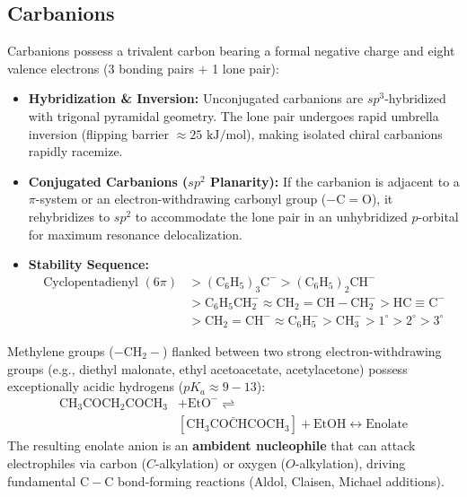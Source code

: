 \documentclass[10pt,twoside,openright]{book}
\begin{document}
\subsection{Carbanions}

\begin{conceptbox}
Carbanions possess a trivalent carbon bearing a formal negative charge and eight valence electrons (3 bonding pairs $+$ 1 lone pair):
\begin{itemize}
  \item \textbf{Hybridization \& Inversion:} Unconjugated carbanions are $sp^3$-hybridized with trigonal pyramidal geometry. The lone pair undergoes rapid umbrella inversion (flipping barrier $\approx 25\text{ kJ/mol}$), making isolated chiral carbanions rapidly racemize.
  \item \textbf{Conjugated Carbanions ($sp^2$ Planarity):} If the carbanion is adjacent to a $\pi$-system or an electron-withdrawing carbonyl group ($-\mathrm{C=O}$), it rehybridizes to $sp^2$ to accommodate the lone pair in an unhybridized $p$-orbital for maximum resonance delocalization.
  \item \textbf{Stability Sequence:}
  \begin{equation}
    \begin{aligned}
      \text{Cyclopentadienyl } (6\pi) &> \mathrm{(C_6H_5)_3C^-} > \mathrm{(C_6H_5)_2CH^-} \\
      &> \mathrm{C_6H_5CH_2^-} \approx \mathrm{CH_2=CH-CH_2^-} > \mathrm{HC\equiv C^-} \\
      &> \mathrm{CH_2=CH^-} \approx \mathrm{C_6H_5^-} > \mathrm{CH_3^-} > 1^\circ > 2^\circ > 3^\circ
    \end{aligned}
  \end{equation}
\end{itemize}
\end{conceptbox}

\begin{usecasebox}
Methylene groups ($-\mathrm{CH_2}-$) flanked between two strong electron-withdrawing groups (e.g., diethyl malonate, ethyl acetoacetate, acetylacetone) possess exceptionally acidic hydrogens ($pK_a \approx 9-13$):
\begin{align}
  \mathrm{CH_3COCH_2COCH_3} &+ \mathrm{EtO^-} \rightleftharpoons \\
  &[\mathrm{CH_3CO\bar{C}HCOCH_3}] + \mathrm{EtOH} \longleftrightarrow \text{Enolate}
\end{align}
The resulting enolate anion is an \textbf{ambident nucleophile} that can attack electrophiles via carbon ($C$-alkylation) or oxygen ($O$-alkylation), driving fundamental $\mathrm{C-C}$ bond-forming reactions (Aldol, Claisen, Michael additions).
\end{usecasebox}
\end{document}
